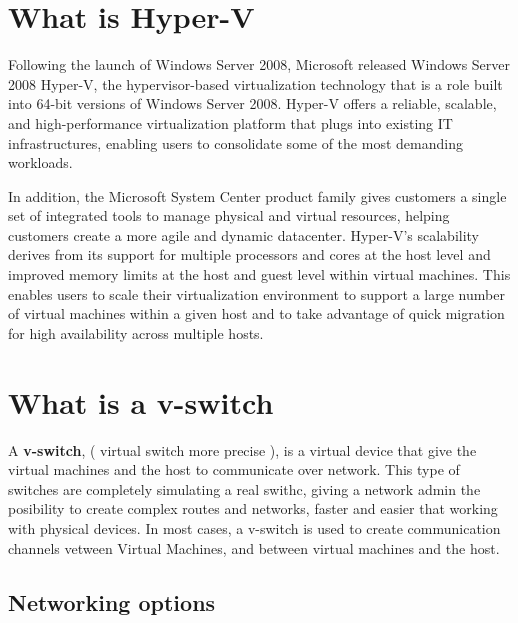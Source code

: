 \vspace{5mm}
\section{What is Hyper-V}
\vspace{5mm}

Following the launch of Windows Server 2008, Microsoft released Windows Server 2008 Hyper-V, the hypervisor-based virtualization technology that is a role 
built into 64-bit versions of Windows Server 2008. Hyper-V offers a reliable, scalable, and high-performance virtualization platform that plugs into existing IT 
infrastructures, enabling users to consolidate some of the most demanding workloads. 

\vspace{5mm}

In addition, the Microsoft System Center product family gives customers a single 
set of integrated tools to manage physical and virtual resources, helping customers create a more agile and dynamic datacenter. Hyper-V’s scalability derives from its 
support for multiple processors and cores at the host level and improved memory limits at the host and guest level within virtual machines. This enables users to scale 
their virtualization environment to support a large number of virtual machines within a given host and to take advantage of quick migration for high availability across 
multiple hosts.

\vspace{5mm}
\section{What is a v-switch}
\vspace{5mm}

A \textbf{v-switch}, ( virtual switch more precise ), is a virtual device that give the virtual machines and the host to communicate over network.
This type of switches are completely simulating a real swithc, giving a network admin the posibility to create complex routes and networks, faster and easier that working
with physical devices. In most cases, a v-switch is used to create communication channels vetween Virtual Machines, and between virtual machines and the host.

\vspace{5mm}
\subsection{Networking options}
\vspace{5mm}

